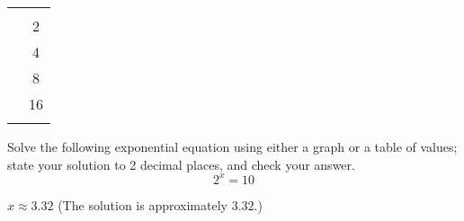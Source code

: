 \begin{table}[!htb]
	\mbox{}\hfill
	\begin{minipage}{.3\textwidth}
		\centering
		\begin{tabular}{S[table-format=1.0]S[table-format=2.0]}
			\beforeheading
			 &  \\
			             & 2               \\             & 4               \\             & 8               \\             & 16              \\\normalline
			\lastline
		\end{tabular}
		\label{exp:tab:solvenoninteger}
	\end{minipage}%
	\hfill
	\begin{minipage}{.4\textwidth}
		\centering
		\label{exp:fig:solvenoninteger}
	\end{minipage}%
	\hfill\mbox{}
\end{table}

\begin{doyouunderstand}
	\begin{problem}
	Solve the following exponential equation using either a graph 
	or a table of values; state your solution to 2 decimal places, and check your answer. 
	\[
		2^x=10
	\]
	\begin{shortsolution}
		$x\approx 3.32$ (The solution is approximately $3.32$.)
	\end{shortsolution}
	\end{problem}
\end{doyouunderstand}

